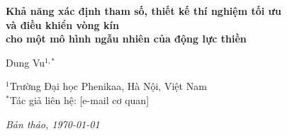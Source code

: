 

\thispagestyle{plain}
\begin{center}
  \vspace{0.4cm}
  {\LARGE\bfseries\color{hdrcol}
    Khả năng xác định tham số, thiết kế thí nghiệm tối ưu\\[4pt]
    và điều khiển vòng kín\\[4pt]
    cho một mô hình ngẫu nhiên của động lực thiền
  }

  \vspace{0.8cm}
  {\large Dung Vu$^{1,*}$}

  \vspace{0.3cm}
  {\small
    $^{1}$Trường Đại học Phenikaa, Hà Nội, Việt Nam\\
    $^{*}$Tác giả liên hệ: [e-mail cơ quan] %
  }

  \vspace{0.3cm}
  {\small\itshape Bản thảo, \today}
\end{center}

